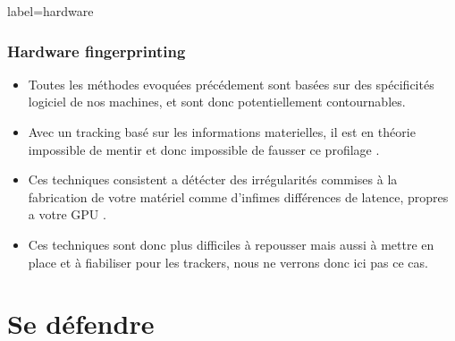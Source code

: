 \documentclass{beamer}
\begin{document}
        \begin{frame}{label=hardware}
            \frametitle{Hardware fingerprinting}
            \begin{center}
                \begin{itemize}
                    \item Toutes les méthodes evoquées précédement sont basées sur des spécificités logiciel de nos machines, et sont donc potentiellement contournables.
                    \item Avec un tracking basé sur les informations materielles, il est en théorie impossible de mentir et donc impossible de fausser ce profilage \cite{hardware}.
                    \item Ces techniques consistent a détécter des irrégularités commises à la fabrication de votre matériel comme d'infimes différences de latence, propres a votre GPU \cite{hardware}.
                    \item Ces techniques sont donc plus difficiles à repousser mais aussi à mettre en place et à fiabiliser pour les trackers, nous ne verrons donc ici pas ce cas.
                \end{itemize}
            \end{center}
        \end{frame}
    \section{Se défendre}
\end{document}
